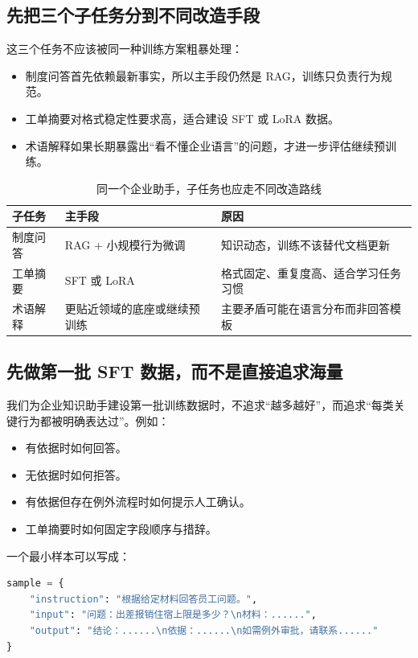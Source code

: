 \subsection{先把三个子任务分到不同改造手段}
这三个任务不应该被同一种训练方案粗暴处理：
\begin{itemize}
  \item 制度问答首先依赖最新事实，所以主手段仍然是 RAG，训练只负责行为规范。
  \item 工单摘要对格式稳定性要求高，适合建设 SFT 或 LoRA 数据。
  \item 术语解释如果长期暴露出“看不懂企业语言”的问题，才进一步评估继续预训练。
\end{itemize}

\begin{table}[H]
\centering
\small
\begin{tabularx}{\textwidth}{>{\raggedright\arraybackslash}p{2.8cm}>{\raggedright\arraybackslash}p{3cm}>{\raggedright\arraybackslash}X}
\toprule
\textbf{子任务} & \textbf{主手段} & \textbf{原因} \\
\midrule
制度问答 & RAG + 小规模行为微调 & 知识动态，训练不该替代文档更新 \\
工单摘要 & SFT 或 LoRA & 格式固定、重复度高、适合学习任务习惯 \\
术语解释 & 更贴近领域的底座或继续预训练 & 主要矛盾可能在语言分布而非回答模板 \\
\bottomrule
\end{tabularx}
\caption{同一个企业助手，子任务也应走不同改造路线}
\label{tab:assistant-task-routing}
\end{table}

\subsection{先做第一批 SFT 数据，而不是直接追求海量}
我们为企业知识助手建设第一批训练数据时，不追求“越多越好”，而追求“每类关键行为都被明确表达过”。例如：
\begin{itemize}
  \item 有依据时如何回答。
  \item 无依据时如何拒答。
  \item 有依据但存在例外流程时如何提示人工确认。
  \item 工单摘要时如何固定字段顺序与措辞。
\end{itemize}

一个最小样本可以写成：
\begin{lstlisting}[language=Python]
sample = {
    "instruction": "根据给定材料回答员工问题。",
    "input": "问题：出差报销住宿上限是多少？\n材料：......",
    "output": "结论：......\n依据：......\n如需例外审批，请联系......"
}
\end{lstlisting}

